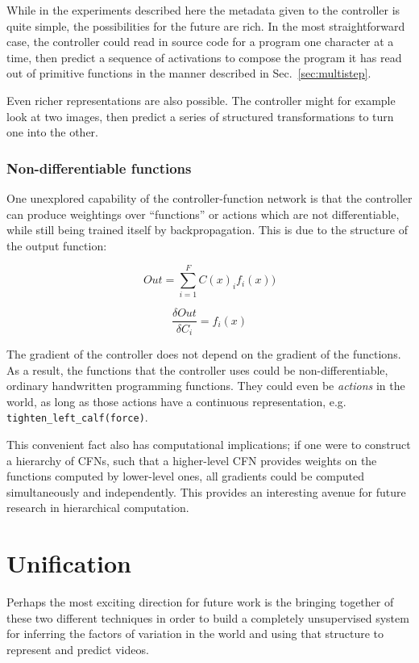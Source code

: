 \documentclass[12pt,twoside]{mitthesis}
\begin{document}
While in the experiments described here the metadata given to the
controller is quite simple, the possibilities for the future are rich.
In the most straightforward case, the controller could read in source
code for a program one character at a time, then predict a sequence of
activations to compose the program it has read out of primitive
functions in the manner described in Sec.~\ref{sec:multistep}.

Even richer representations are also possible. The controller might for
example look at two images, then predict a series of structured
transformations to turn one into the other.

\subsubsection{Non-differentiable
functions}\label{non-differentiable-functions}

One unexplored capability of the controller-function network is that the
controller can produce weightings over ``functions'' or actions which
are not differentiable, while still being trained itself by
backpropagation. This is due to the structure of the output function:

\[Out = \sum_{i=1}^F C(x)_ {i} f_i(x))\]

\[\frac{\delta Out}{\delta C_i} = f_i(x)\]

The gradient of the controller does not depend on the gradient of the
functions. As a result, the functions that the controller uses could be
non-differentiable, ordinary handwritten programming functions. They
could even be \emph{actions} in the world, as long as those actions have
a continuous representation, e.g. \texttt{tighten\_left\_calf(force)}.

This convenient fact also has computational implications; if one were to
construct a hierarchy of CFNs, such that a higher-level CFN provides
weights on the functions computed by lower-level ones, all gradients
could be computed simultaneously and independently. This provides an
interesting avenue for future research in hierarchical computation.

\section{Unification}\label{unification}

Perhaps the most exciting direction for future work is the bringing
together of these two different techniques in order to build a
completely unsupervised system for inferring the factors of variation in
the world and using that structure to represent and predict videos.
\end{document}
